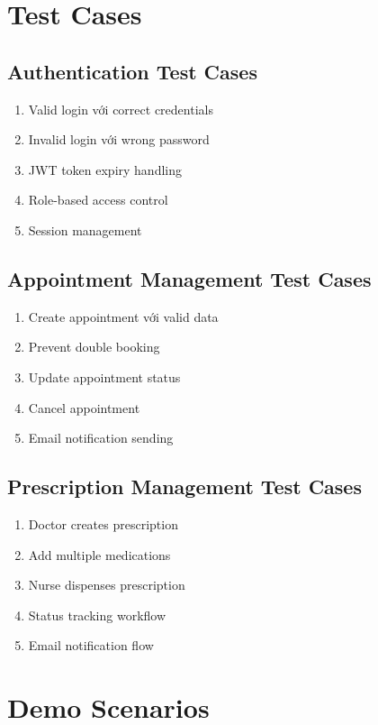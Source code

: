 \documentclass[12pt,a4paper]{report}
\begin{document}
\section{Test Cases}

\subsection{Authentication Test Cases}
\begin{enumerate}
    \item Valid login với correct credentials
    \item Invalid login với wrong password
    \item JWT token expiry handling
    \item Role-based access control
    \item Session management
\end{enumerate}

\subsection{Appointment Management Test Cases}
\begin{enumerate}
    \item Create appointment với valid data
    \item Prevent double booking
    \item Update appointment status
    \item Cancel appointment
    \item Email notification sending
\end{enumerate}

\subsection{Prescription Management Test Cases}
\begin{enumerate}
    \item Doctor creates prescription
    \item Add multiple medications
    \item Nurse dispenses prescription
    \item Status tracking workflow
    \item Email notification flow
\end{enumerate}

\section{Demo Scenarios}
\end{document}
